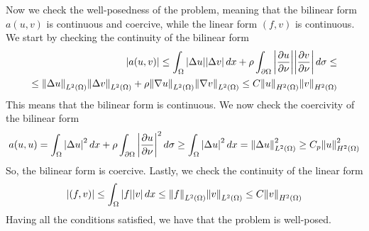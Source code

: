 Now we check the well-posedness of the problem, meaning that the bilinear form \(a(u, v)\) is continuous and coercive, while the linear form \((f, v)\) is continuous. We start by checking the continuity of the bilinear form
\[
   \begin{split}
     \abs{a(u, v)} \leq \int_\Omega \abs{\Delta u} \abs{\Delta v} \, dx + \rho \int_{\partial \Omega} \abs{\frac{\partial u}{\partial \nu}} \abs{\frac{\partial v}{\partial \nu}} \, d\sigma \leq \\
    \leq \norm{\Delta u}_{L^2(\Omega)} \norm{\Delta v}_{L^2(\Omega)} + \rho \norm{\nabla u}_{L^2(\Omega)} \norm{\nabla v}_{L^2(\Omega)} \leq C \norm{u}_{H^2(\Omega)} \norm{v}_{H^2(\Omega)} 
   \end{split} 
\]
This means that the bilinear form is continuous. We now check the coercivity of the bilinear form
\[
    \begin{split}
        a(u, u) = \int_\Omega \abs{\Delta u}^2 \, dx + \rho \int_{\partial \Omega} \abs{\frac{\partial u}{\partial \nu}}^2 \, d\sigma \geq \int_\Omega \abs{\Delta u}^2 \, dx = \norm{\Delta u}_{L^2(\Omega)}^2 \geq C_p \norm{u}_{H^2(\Omega)}^2
    \end{split}
\]
So, the bilinear form is coercive. Lastly, we check the continuity of the linear form
\[
    \begin{split}
        \abs{(f, v)} \leq \int_\Omega \abs{f} \abs{v} \, dx \leq \norm{f}_{L^2(\Omega)} \norm{v}_{L^2(\Omega)} \leq C \norm{v}_{H^2(\Omega)}
    \end{split}
\]
Having all the conditions satisfied, we have that the problem is well-posed.

\newpage
